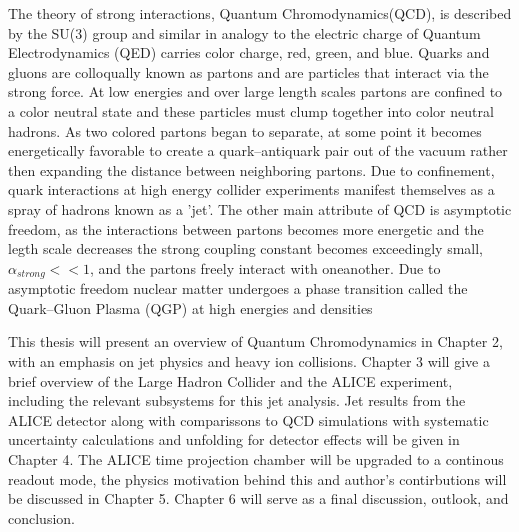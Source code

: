 \par
The theory of strong interactions, Quantum Chromodynamics(QCD), is described by the SU(3) group and similar in analogy to the electric charge of Quantum Electrodynamics (QED) carries color charge, red, green, and blue.  Quarks and gluons are colloqually known as partons and are particles that interact via the strong force.  At low energies and over large length scales partons are confined to a color neutral state and these particles must clump together into color neutral hadrons.  As two colored partons began to separate, at some point it becomes energetically favorable to create a quark--antiquark pair out of the vacuum rather then expanding the distance between neighboring partons.  Due to confinement, quark interactions at high energy collider experiments manifest themselves as a spray of hadrons known as a 'jet'.  The other main attribute of QCD is asymptotic freedom, as the interactions between partons becomes more energetic and the legth scale decreases  the strong coupling constant becomes exceedingly small, $ \alpha_{strong} << 1$, and the partons freely interact with oneanother.  Due to asymptotic freedom nuclear matter undergoes a phase transition called the Quark--Gluon Plasma (QGP) at high energies and densities 






\par
This thesis will present an overview of Quantum Chromodynamics in Chapter 2, with an emphasis on jet physics and heavy ion collisions.  Chapter 3 will give a brief overview of the Large Hadron Collider and the ALICE experiment, including the relevant subsystems for this jet analysis.  Jet results from the ALICE detector along with comparissons to QCD simulations with systematic uncertainty calculations and unfolding for detector effects will be given in Chapter 4.  The ALICE time projection chamber will be upgraded to a continous readout mode, the physics motivation behind this and author's contirbutions will be discussed in Chapter 5.  Chapter 6 will serve as a final discussion, outlook, and conclusion. 